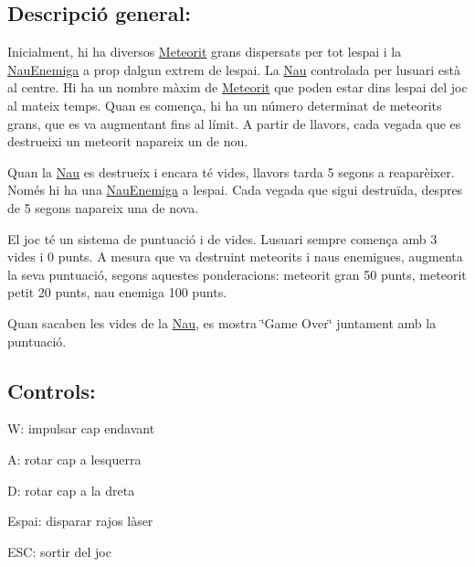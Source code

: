 \subsection*{Descripció general\+: }

Inicialment, hi ha diversos \hyperlink{class_meteorit}{Meteorit} grans dispersats per tot l\textquotesingle{}espai i la \hyperlink{class_nau_enemiga}{Nau\+Enemiga} a prop d\textquotesingle{}algun extrem de l\textquotesingle{}espai. La \hyperlink{class_nau}{Nau} controlada per l\textquotesingle{}usuari està al centre. Hi ha un nombre màxim de \hyperlink{class_meteorit}{Meteorit} que poden estar dins l\textquotesingle{}espai del joc al mateix temps. Quan es comença, hi ha un número determinat de meteorits grans, que es va augmentant fins al límit. A partir de llavors, cada vegada que es destrueixi un meteorit n\textquotesingle{}apareix un de nou.

Quan la \hyperlink{class_nau}{Nau} es destrueix i encara té vides, llavors tarda 5 segons a reaparèixer. Només hi ha una \hyperlink{class_nau_enemiga}{Nau\+Enemiga} a l\textquotesingle{}espai. Cada vegada que sigui destruïda, despres de 5 segons n\textquotesingle{}apareix una de nova.

El joc té un sistema de puntuació i de vides. L\textquotesingle{}usuari sempre comença amb 3 vides i 0 punts. A mesura que va destruint meteorits i naus enemigues, augmenta la seva puntuació, segons aquestes ponderacions\+: meteorit gran 50 punts, meteorit petit 20 punts, nau enemiga 100 punts.

Quan s\textquotesingle{}acaben les vides de la \hyperlink{class_nau}{Nau}, es mostra \char`\"{}\+Game Over\char`\"{} juntament amb la puntuació.

\subsection*{Controls\+: }


\begin{DoxyItemize}
\item W\+: impulsar cap endavant
\item A\+: rotar cap a l\textquotesingle{}esquerra
\item D\+: rotar cap a la dreta
\item Espai\+: disparar rajos làser
\item E\+S\+C\+: sortir del joc 
\end{DoxyItemize}